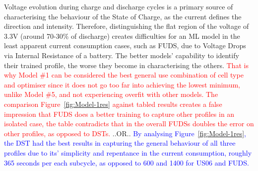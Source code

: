 %
%
%
%
%
%
%
%
%
%
%
%
% 
%
%
Voltage evolution during charge and discharge cycles is a primary source of characterising the behaviour of the State of Charge, as the current defines the direction and intensity.
Therefore, distinguishing the flat region of the voltage of 3.3V (around 70-30\% of discharge) creates difficulties for an ML model in the least apparent current consumption cases, such as FUDS, due to Voltage Drops via Internal Resistance of a battery.
The better models' capability to identify their trained profile, the worse they become in characterising the others.
\textcolor{red}{
That is why Model \#1 can be considered the best general use combination of cell type and optimiser since it does not go too far into achieving the lowest minimum, unlike Model \#5, and not experiencing overfit with other models.
}
%
\textcolor{red}{The comparison Figure~\ref{fig:Model-1res} against tabled results creates a false impression that FUDS does a better training to capture other profiles in an isolated case, the table contradicts that in the overall FUDSs doubles the error on other profiles, as opposed to DSTs.}
..OR..
\textcolor{blue}{By analysing Figure~\ref{fig:Model-1res}, the DST had the best results in capturing the general behaviour of all three profiles due to its' simplicity and repentance in the current consumption, roughly 365 seconds per each subcycle, as opposed to 600 and 1400 for US06 and FUDS.}

